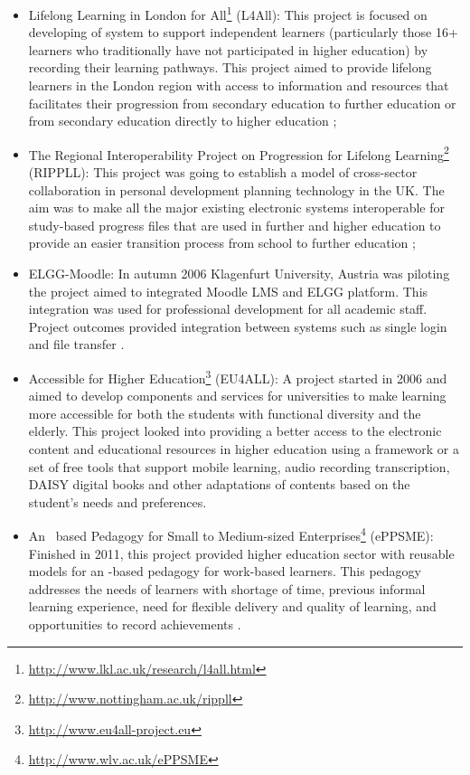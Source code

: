\begin{itemize}

  \item Lifelong Learning in London for
  All\footnote{\url{http://www.lkl.ac.uk/research/l4all.html}} (L4All): This
  project is focused on developing of \LLLs system to support independent
  learners (particularly those 16+ learners who traditionally have not
  participated in higher education) by recording their learning pathways. This
  project aimed to provide lifelong learners in the London region with access to
  information and resources that facilitates their progression from secondary
  education to further education or from secondary education directly to higher
  education \citep{Freitas2006};

  \item The Regional Interoperability Project on Progression for Lifelong
Learning\footnote{\url{http://www.nottingham.ac.uk/rippll}} (RIPPLL): This
project was going to establish a model of cross-sector collaboration in personal
development planning technology in the UK. The aim was to make all the major
existing electronic systems interoperable for study-based progress files that
are used in further and higher education to provide an easier transition process
from school to further education \citep{Hartnell-Young2006};

  \item ELGG-Moodle: In autumn 2006 Klagenfurt University, Austria was piloting
the project aimed to integrated Moodle LMS and ELGG platform. This integration
was used for professional development for all academic staff. Project outcomes
provided integration between systems such as single login and file transfer
\citep{Attwell2007}.

  \item Accessible \LLLc for Higher
  Education\footnote{\url{http://www.eu4all-project.eu}} (EU4ALL): A project
  started in 2006 and aimed to develop components and services for universities
  to make learning more accessible for both the students with functional
  diversity and the elderly. This project looked into providing a better access
  to the electronic content and educational resources in higher education using
  a framework or a set of free tools that support mobile learning, audio
  recording transcription, DAISY digital books and other adaptations of contents
  based on the student's needs and preferences.

  \item An \ep~based Pedagogy for Small to Medium-sized
  Enterprises\footnote{\url{http://www.wlv.ac.uk/ePPSME}} (ePPSME): Finished
  in 2011, this project provided higher education sector with reusable models
  for an \ep-based pedagogy for work-based learners. This pedagogy addresses
  the needs of learners with shortage of time, previous informal learning
  experience, need for flexible delivery and quality of learning, and
  opportunities to record achievements \citep{Felce2011}.
\end{itemize}

